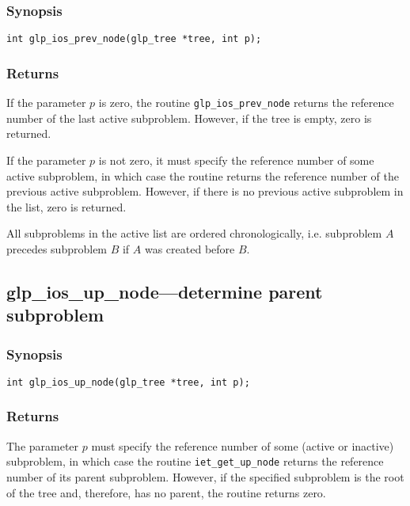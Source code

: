 \subsubsection*{Synopsis}

\begin{verbatim}
int glp_ios_prev_node(glp_tree *tree, int p);
\end{verbatim}

\subsubsection*{Returns}

If the parameter $p$ is zero, the routine \verb|glp_ios_prev_node|
returns the reference number of the last active subproblem. However, if
the tree is empty, zero is returned.

If the parameter $p$ is not zero, it must specify the reference number
of some active subproblem, in which case the routine returns the
reference number of the previous active subproblem. However, if there
is no previous active subproblem in the list, zero is returned.

All subproblems in the active list are ordered chronologically, i.e.
subproblem $A$ precedes subproblem $B$ if $A$ was created before $B$.

\newpage

\subsection{glp\_ios\_up\_node---determine parent subproblem}

\subsubsection*{Synopsis}

\begin{verbatim}
int glp_ios_up_node(glp_tree *tree, int p);
\end{verbatim}

\subsubsection*{Returns}

The parameter $p$ must specify the reference number of some (active or
inactive) subproblem, in which case the routine \verb|iet_get_up_node|
returns the reference number of its parent subproblem. However, if the
specified subproblem is the root of the tree and, therefore, has
no parent, the routine returns zero.

